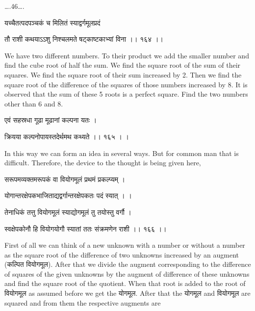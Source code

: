 \documentclass[]{article}
\date{}
\begin{document}
{\ldots{}.46\ldots{}.}

{यच्चैतत्पदपञ्चकं च मिलितं स्याद्वर्गमूलप्रदं }

{तौ राशी कथयाऽऽशु निश्चलमते षट्काष्टकाभ्यां विना ।। १६४ ।। }

{We have two different numbers. To their product we add the smaller
number and find the cube root of half the sum. We find the square root
of the sum of their squares. We find the square root of their sum
increased by 2. Then we find the square root of the difference of the
squares of those numbers increased by 8. It is observed that the sum of
these 5 roots is a perfect square. Find the two numbers other than 6 and
8.}

{एवं सहस्रधा गूढा मूढानां कल्पना यतः । }

{क्रियया कल्पनोपायस्तदेर्थमथ कथ्यते ।। १६५ । । }

{In this way we can form an idea in several ways. But for common man
that is difficult. Therefore, the device to the thought is being given
here,}

{सरूपमव्यक्तमरूपकं वा वियोगमूलं प्रथमं प्रकल्प्यम् । }

{योगान्तरक्षेपकभाजिताद्यद्वर्गान्तरक्षेपकतः पदं स्यात् । । }

{तेनाधिकं तत्तु वियोगमूलं स्याद्योगमूलं तु तयोस्तु वर्गौ । }

{स्वक्षेपकोनौ हि वियोगयोगौ स्यातां ततः संक्रमणेन राशी ।। १६६ ।। }

{First of all we can think of a new unknown with a number or without a
number as the square root of the difference of two unknowns increased by
an augment (कल्पित वियोगमूल). After that we divide the augment
corresponding to the difference of squares of the given unknowns by the
augment of difference of these unknowns and find the square root of the
quotient. When that root is added to the root of वियोगमूल as assumed
before we get the योगमूल. After that the योगमूल and वियोगमूल are squared
and from them the respective augments are\\
}
\end{document}
